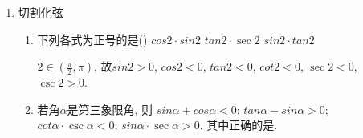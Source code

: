 \begin{enumerate}
\begin{enumerate}
\begin{jieda}
\begin{enumerate}
        \item $sin^3 \alpha + cos^3 \alpha = (sin\alpha + cos\alpha)(sin^2 \alpha + cos^2 \alpha - sin\alpha cos\alpha) = (\frac{1}{5})(1 + \frac{12}{25}) = \frac{37}{125}$ \\
        \ps 也可以在第一问的结果上构建方程组$\left \{ \begin{array}{}
            sin\alpha + cos\alpha = \frac{1}{5} \\
            sin\alpha - cos\alpha = \frac{7}{5} 
        \end{array}\right.$解得$\left \{ \begin{array}{}
            sin\alpha = \frac{4}{5} \\
            cos\alpha = -\frac{3}{5} 
        \end{array}\right.$后带入计算（下同）
        \item $ sin ^4 \alpha+ cos ^4 \alpha = ( sin ^2 \alpha+ cos ^2 \alpha)^2 - 2(sin \alpha cos\alpha)^2 = 1 - 2 \times (-\frac{12}{25})^2 = \frac{337}{625}$
    \end{enumerate}
\end{jieda}
    \end{enumerate}
    \item 切割化弦
    \begin{enumerate}
        \item 下列各式为正号的是\dotfill()
        {$ cos2\cdot sin2$}
        {$ tan2\cdot\sec2$}
        {$ sin2\cdot tan2$}
        \begin{jieda}
        $2\in(\frac{\pi}{2},\pi)$, 故$ sin2>0$, $ cos2<0$, $ tan2<0$, $ cot2<0$, $\sec2<0$, $\csc2>0$. 
        \end{jieda}
        \item 若角$\alpha$是第三象限角, 则
         $ sin\alpha+ cos\alpha<0$; 
         $ tan\alpha- sin\alpha>0$; 
         $ cot\alpha\cdot\csc\alpha<0$; 
         $ sin\alpha\cdot\sec\alpha>0$. 
        其中正确的是.  
        

\end{enumerate}
\end{enumerate}
